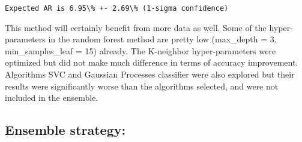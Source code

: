 \documentclass[a4paper,12pt]{article}
\begin{document}
\vspace{-0.5cm}
    \begin{center}
    \end{center}
     \begin{Verbatim}[commandchars=\\\{\},fontsize=\small]
Expected AR is 6.95\% +- 2.69\% (1-sigma confidence)
    \end{Verbatim}
\vspace{-0.5cm}
    \begin{center}
    \end{center}
This method will certainly benefit from more data as well. Some of the hyper-parameters in the random forest method are pretty low (max\_depth
= 3, min\_samples\_leaf = 15) already. The K-neighbor hyper-parameters were optimized but did not make much difference in terms of accuracy improvement. Algorithms SVC and Gaussian Processes classifier were also explored but their results were significantly worse than the algorithms selected, and were not included in the ensemble.

    \hypertarget{ensemble-strategy}{%
\subsection{Ensemble strategy:}\label{ensemble-strategy}}
\end{document}
